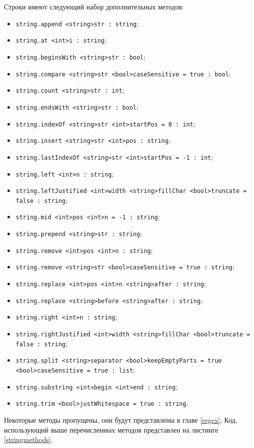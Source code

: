 \documentclass[a4paper, 14pt]{extarticle}
\newenvironment{icItems}
	{ \begin{itemize} [noitemsep,nolistsep] }
	{ \end{itemize} }
\begin{document}
Строки имеют следующий набор дополнительных методов:
\begin{icItems}
\item
	\lstinline|string.append <string>str : string|;
\item
	\lstinline|string.at <int>i : string|;
\item
	\lstinline|string.beginsWith <string>str : bool|;
\item
	\lstinline|string.compare <string>str <bool>caseSensitive = true : bool|;
\item
	\lstinline|string.count <string>str : int|;
\item
	\lstinline|string.endsWith <string>str : bool|;
\item
	\lstinline|string.indexOf <string>str <int>startPos = 0 : int|;
\item
	\lstinline|string.insert <string>str <int>pos : string|;
\item
	\lstinline|string.lastIndexOf <string>str <int>startPos = -1 : int|;
\item
	\lstinline|string.left <int>n : string|;
\item
	\lstinline|string.leftJustified <int>width <string>fillChar <bool>truncate = false : string|;
\item
	\lstinline|string.mid <int>pos <int>n = -1 : string|;
\item
	\lstinline|string.prepend <string>str : string|;
\item
	\lstinline|string.remove <int>pos <int>n : string|;
\item
	\lstinline|string.remove <string>str <bool>caseSensitive = true : string|;
\item
	\lstinline|string.replace <int>pos <int>n <string>after : string|;
\item
	\lstinline|string.replace <string>before <string>after : string|;
\item
	\lstinline|string.right <int>n : string|;
\item
	\lstinline|string.rightJustified <int>width <string>fillChar <bool>truncate = false : string|;
\item
	\lstinline|string.split <string>separator <bool>keepEmptyParts = true <bool>caseSensitive = true : list|;
\item
	\lstinline|string.substring <int>begin <int>end : string|;
\item
	\lstinline|string.trim <bool>justWhitespace = true : string|.
\end{icItems}

Некоторые методы пропущены, они будут представлены в главе \ref{regex}; Код, использующий выше перечисленных методов представлен на листинге \ref{stringmethods}.
\end{document}
